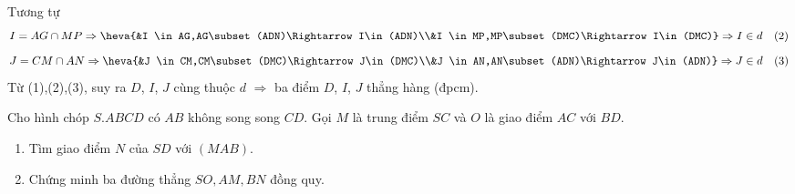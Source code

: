 \begin{bt}
\begin{vd}
{\begin{enumerate}
			Tương tự
			$$I=AG\cap MP \Rightarrow \heva{&I \in AG,AG\subset (ADN)\Rightarrow I\in(ADN)\\&I \in MP,MP\subset (DMC)\Rightarrow I\in(DMC)}\Rightarrow I\in d\quad (2)$$
			$$J=CM\cap AN \Rightarrow \heva{&J \in CM,CM\subset (DMC)\Rightarrow J\in(DMC)\\&J \in AN,AN\subset (ADN)\Rightarrow J\in(ADN)}\Rightarrow J\in d\quad (3)$$
			Từ (1),(2),(3), suy ra $D$, $I$, $J$ cùng thuộc $d$ $\Rightarrow$ ba điểm $D$, $I$, $J$ thẳng hàng (đpcm).
		\end{enumerate}	
	}
\end{vd}

\begin{vd}%
	Cho hình chóp $S.ABCD$ có $AB$ không song song $CD$. Gọi $M$ là trung điểm $SC$ và $O$ là giao điểm $AC$ với $BD$.
	\begin{enumerate}
		\item Tìm giao điểm $N$ của $SD$ với $(MAB)$.
		\item Chứng minh ba đường thẳng $SO, AM, BN$ đồng quy.
	\end{enumerate}
\end{vd}
\end{bt}
